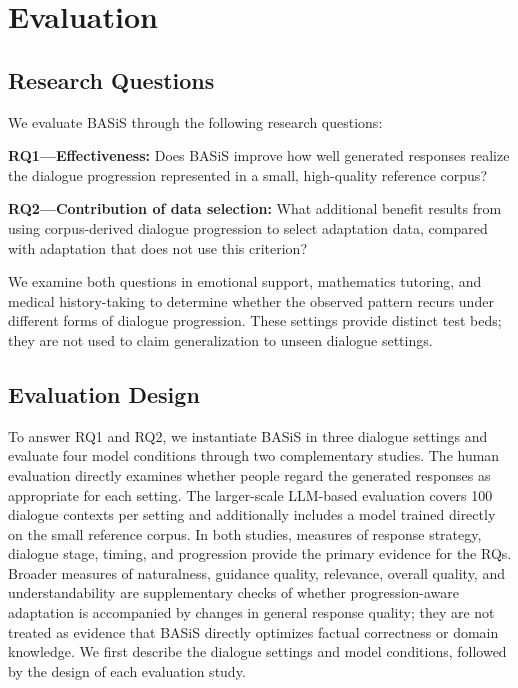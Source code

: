 \documentclass[manuscript,review,anonymous]{acmart}
\begin{document}
\section{Evaluation}
\label{sec:evaluation}
\label{sec:setup}

\subsection{Research Questions}
\label{sec:eval_objectives}

We evaluate BASiS through the following research questions:

\noindent\textbf{RQ1---Effectiveness:} Does BASiS improve how well generated responses realize the dialogue progression represented in a small, high-quality reference corpus?

\noindent\textbf{RQ2---Contribution of data selection:} What additional benefit results from using corpus-derived dialogue progression to select adaptation data, compared with adaptation that does not use this criterion?

We examine both questions in emotional support, mathematics tutoring, and medical history-taking to determine whether the observed pattern recurs under different forms of dialogue progression. These settings provide distinct test beds; they are not used to claim generalization to unseen dialogue settings.

\subsection{Evaluation Design}
\label{sec:eval_methodology}

To answer RQ1 and RQ2, we instantiate BASiS in three dialogue settings and evaluate four model conditions through two complementary studies. The human evaluation directly examines whether people regard the generated responses as appropriate for each setting. The larger-scale LLM-based evaluation covers 100 dialogue contexts per setting and additionally includes a model trained directly on the small reference corpus. In both studies, measures of response strategy, dialogue stage, timing, and progression provide the primary evidence for the RQs. Broader measures of naturalness, guidance quality, relevance, overall quality, and understandability are supplementary checks of whether progression-aware adaptation is accompanied by changes in general response quality; they are not treated as evidence that BASiS directly optimizes factual correctness or domain knowledge. We first describe the dialogue settings and model conditions, followed by the design of each evaluation study.
\end{document}
